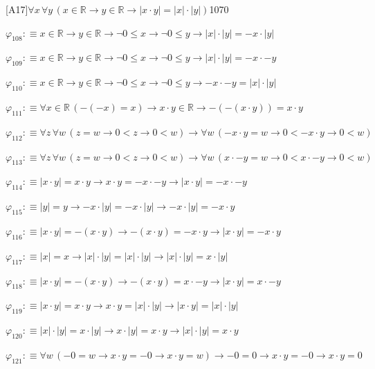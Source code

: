 \begin{fullproof}{[A17]}{$\forall x\,\forall y\,(x \in \mathbb{R} \to y \in \mathbb{R} \to \lvert x \cdot y \rvert = \lvert x \rvert \cdot \lvert y \rvert)$}{1070}
\begin{abbrevlist}
\item $\varphi_{108} :\equiv x \in \mathbb{R} \to y \in \mathbb{R} \to \neg 0 \leq x \to \neg 0 \leq y \to \lvert x \rvert \cdot \lvert y \rvert = -x \cdot \lvert y \rvert$
\item $\varphi_{109} :\equiv x \in \mathbb{R} \to y \in \mathbb{R} \to \neg 0 \leq x \to \neg 0 \leq y \to \lvert x \rvert \cdot \lvert y \rvert = -x \cdot -y$
\item $\varphi_{110} :\equiv x \in \mathbb{R} \to y \in \mathbb{R} \to \neg 0 \leq x \to \neg 0 \leq y \to -x \cdot -y = \lvert x \rvert \cdot \lvert y \rvert$
\item $\varphi_{111} :\equiv \forall x \in \mathbb{R}\,(-(-x) = x) \to x \cdot y \in \mathbb{R} \to -(-(x \cdot y)) = x \cdot y$
\item $\varphi_{112} :\equiv \forall z\,\forall w\,(z = w \to 0 < z \to 0 < w) \to \forall w\,(-x \cdot y = w \to 0 < -x \cdot y \to 0 < w)$
\item $\varphi_{113} :\equiv \forall z\,\forall w\,(z = w \to 0 < z \to 0 < w) \to \forall w\,(x \cdot -y = w \to 0 < x \cdot -y \to 0 < w)$
\item $\varphi_{114} :\equiv \lvert x \cdot y \rvert = x \cdot y \to x \cdot y = -x \cdot -y \to \lvert x \cdot y \rvert = -x \cdot -y$
\item $\varphi_{115} :\equiv \lvert y \rvert = y \to -x \cdot \lvert y \rvert = -x \cdot \lvert y \rvert \to -x \cdot \lvert y \rvert = -x \cdot y$
\item $\varphi_{116} :\equiv \lvert x \cdot y \rvert = -(x \cdot y) \to -(x \cdot y) = -x \cdot y \to \lvert x \cdot y \rvert = -x \cdot y$
\item $\varphi_{117} :\equiv \lvert x \rvert = x \to \lvert x \rvert \cdot \lvert y \rvert = \lvert x \rvert \cdot \lvert y \rvert \to \lvert x \rvert \cdot \lvert y \rvert = x \cdot \lvert y \rvert$
\item $\varphi_{118} :\equiv \lvert x \cdot y \rvert = -(x \cdot y) \to -(x \cdot y) = x \cdot -y \to \lvert x \cdot y \rvert = x \cdot -y$
\item $\varphi_{119} :\equiv \lvert x \cdot y \rvert = x \cdot y \to x \cdot y = \lvert x \rvert \cdot \lvert y \rvert \to \lvert x \cdot y \rvert = \lvert x \rvert \cdot \lvert y \rvert$
\item $\varphi_{120} :\equiv \lvert x \rvert \cdot \lvert y \rvert = x \cdot \lvert y \rvert \to x \cdot \lvert y \rvert = x \cdot y \to \lvert x \rvert \cdot \lvert y \rvert = x \cdot y$
\item $\varphi_{121} :\equiv \forall w\,(-0 = w \to x \cdot y = -0 \to x \cdot y = w) \to -0 = 0 \to x \cdot y = -0 \to x \cdot y = 0$

\end{abbrevlist}
\end{fullproof}
